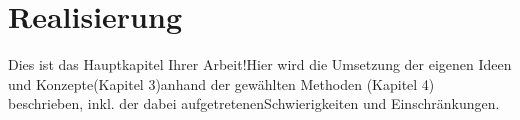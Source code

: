 \chapter{Realisierung}


Dies ist das Hauptkapitel Ihrer Arbeit!Hier wird die Umsetzung der eigenen Ideen und Konzepte(Kapitel 3)anhand der gewählten Methoden (Kapitel 4) beschrieben, inkl. der dabei aufgetretenenSchwierigkeiten und Einschränkungen.